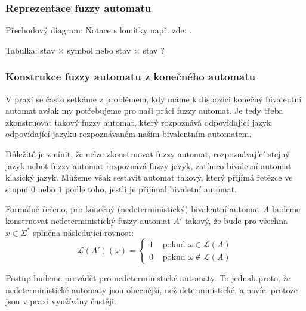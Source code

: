 \documentclass[a4paper,10pt]{article}
\begin{document}

\subsubsection*{Reprezentace fuzzy automatu}


Přechodový diagram: Notace s lomítky např. zde: \cite{GonGar-FuzzLangInfRanAccGuzzAutPumLemDetProc}.

Tabulka: stav $\times$ symbol nebo stav $\times$ stav \cite{DooKre-NewDirFuzzAut}?

\subsubsection*{Konstrukce fuzzy automatu z konečného automatu}
V praxi se často setkáme z problémem, kdy máme k dispozici konečný bivalentní automat avšak my potřebujeme pro naši práci fuzzy automat. Je tedy třeba zkonstruovat takový fuzzy automat, který rozpoznává odpovídající jazyk odpovídající jazyku rozpoznávaném naším bivalentním automatem. 

Důležité je zmínit, že nelze zkonstruovat fuzzy automat, rozpoznávající stejný jazyk neboť fuzzy automat rozpoznává fuzzy jazyk, zatímco bivaletní automat klasický  jazyk. Můžeme však sestavit automat takový, který přijímá řetězce ve stupni $0$ nebo $1$ podle toho, jestli je přijímal bivaletní automat.

Formálně řečeno, pro konečný (nedeterministický) bivalentní automat $A$ budeme konstruovat nedeterministický fuzzy automat $A'$ takový, že bude pro všechna $x \in \Sigma^*$ splněna následující rovnost:
$$
 \mathcal{L}(A')(\omega) = 
  \begin{cases}
   1 & \text{ pokud } \omega \in \mathcal{L}(A) \\
   0 & \text{ pokud } \omega \notin \mathcal{L}(A)
  \end{cases}
$$

\begin{note}
 Postup budeme provádět pro nedeterministické automaty. To jednak proto, že nedeterministické automaty jsou obecnější, než deterministické, a navíc, protože jsou v praxi využívány častěji. 
\end{note}
\end{document}
